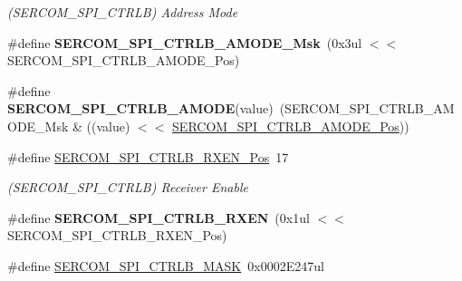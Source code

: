 \begin{DoxyCompactItemize}
\begin{DoxyCompactList}\small\item\em (S\+E\+R\+C\+O\+M\+\_\+\+S\+P\+I\+\_\+\+C\+T\+R\+L\+B) Address Mode \end{DoxyCompactList}\item 
\hypertarget{group___s_a_m_l21___s_e_r_c_o_m_ga2f3e0febb3626f68cc5fc7c9a0d51635}{}\#define {\bfseries S\+E\+R\+C\+O\+M\+\_\+\+S\+P\+I\+\_\+\+C\+T\+R\+L\+B\+\_\+\+A\+M\+O\+D\+E\+\_\+\+Msk}~(0x3ul $<$$<$ S\+E\+R\+C\+O\+M\+\_\+\+S\+P\+I\+\_\+\+C\+T\+R\+L\+B\+\_\+\+A\+M\+O\+D\+E\+\_\+\+Pos)\label{group___s_a_m_l21___s_e_r_c_o_m_ga2f3e0febb3626f68cc5fc7c9a0d51635}

\item 
\hypertarget{group___s_a_m_l21___s_e_r_c_o_m_ga484e448818cd05a171de76a0f41b3052}{}\#define {\bfseries S\+E\+R\+C\+O\+M\+\_\+\+S\+P\+I\+\_\+\+C\+T\+R\+L\+B\+\_\+\+A\+M\+O\+D\+E}(value)~(S\+E\+R\+C\+O\+M\+\_\+\+S\+P\+I\+\_\+\+C\+T\+R\+L\+B\+\_\+\+A\+M\+O\+D\+E\+\_\+\+Msk \& ((value) $<$$<$ \hyperlink{group___s_a_m_l21___s_e_r_c_o_m_ga48799d0ce0df98d60ec4c7cbddfbabe9}{S\+E\+R\+C\+O\+M\+\_\+\+S\+P\+I\+\_\+\+C\+T\+R\+L\+B\+\_\+\+A\+M\+O\+D\+E\+\_\+\+Pos}))\label{group___s_a_m_l21___s_e_r_c_o_m_ga484e448818cd05a171de76a0f41b3052}

\item 
\hypertarget{group___s_a_m_l21___s_e_r_c_o_m_ga1cc329b6d1b1b57463fc4afa8ba364f1}{}\#define \hyperlink{group___s_a_m_l21___s_e_r_c_o_m_ga1cc329b6d1b1b57463fc4afa8ba364f1}{S\+E\+R\+C\+O\+M\+\_\+\+S\+P\+I\+\_\+\+C\+T\+R\+L\+B\+\_\+\+R\+X\+E\+N\+\_\+\+Pos}~17\label{group___s_a_m_l21___s_e_r_c_o_m_ga1cc329b6d1b1b57463fc4afa8ba364f1}

\begin{DoxyCompactList}\small\item\em (S\+E\+R\+C\+O\+M\+\_\+\+S\+P\+I\+\_\+\+C\+T\+R\+L\+B) Receiver Enable \end{DoxyCompactList}\item 
\hypertarget{group___s_a_m_l21___s_e_r_c_o_m_ga9db2bfa0aefcb3ba6f5221920cec3b08}{}\#define {\bfseries S\+E\+R\+C\+O\+M\+\_\+\+S\+P\+I\+\_\+\+C\+T\+R\+L\+B\+\_\+\+R\+X\+E\+N}~(0x1ul $<$$<$ S\+E\+R\+C\+O\+M\+\_\+\+S\+P\+I\+\_\+\+C\+T\+R\+L\+B\+\_\+\+R\+X\+E\+N\+\_\+\+Pos)\label{group___s_a_m_l21___s_e_r_c_o_m_ga9db2bfa0aefcb3ba6f5221920cec3b08}

\item 
\hypertarget{group___s_a_m_l21___s_e_r_c_o_m_ga8ef04e3216a97881e49a69692cae55b3}{}\#define \hyperlink{group___s_a_m_l21___s_e_r_c_o_m_ga8ef04e3216a97881e49a69692cae55b3}{S\+E\+R\+C\+O\+M\+\_\+\+S\+P\+I\+\_\+\+C\+T\+R\+L\+B\+\_\+\+M\+A\+S\+K}~0x0002\+E247ul\label{group___s_a_m_l21___s_e_r_c_o_m_ga8ef04e3216a97881e49a69692cae55b3}


\end{DoxyCompactItemize}
